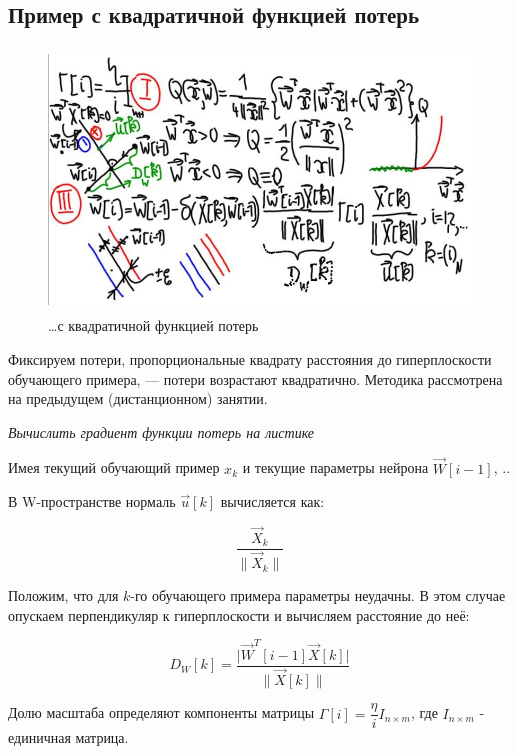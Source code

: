 \documentclass{article}
\numberwithin{equation}{subsection}
\begin{document}
\subsection{Пример с квадратичной функцией потерь}

\begin{figure}[htbp]
    \centering
    \includegraphics[height=7cm]{hyperflat_8_1.jpeg}
    \caption{\dots с квадратичной функцией потерь}
    \label{hyperflat_8_1}
\end{figure}

Фиксируем потери, пропорциональные квадрату расстояния до гиперплоскости обучающего 
примера, --- потери возрастают квадратично. Методика рассмотрена на предыдущем 
(дистанционном) занятии.

\begin{myquote}
    \textit{Вычислить градиент функции потерь на листике}
\end{myquote}

Имея текущий обучающий пример $x_k$ и текущие параметры нейрона $\vec{W}[i-1]$,
..

В W-пространстве нормаль $\vec{u}[k]$ вычисляется как: 

\begin{equation}
    \dfrac{\vec{X}_k}{\| \vec{X}_k \|}
\end{equation}

Положим, что для $k$-го обучающего примера параметры неудачны. В этом случае опускаем перпендикуляр
к гиперплоскости и вычисляем расстояние до неё:

\begin{equation}
    D_W [k] = \dfrac{\lvert \vec{W}^T [i-1] \vec{X}[k] \rvert}{\| \vec{X}[k] \|}
\end{equation}

Долю масштаба определяют компоненты матрицы $\Gamma[i]=\dfrac{\eta}{i} I_{n\times m}$, где $I_{n \times m}$ - единичная матрица.
\end{document}
